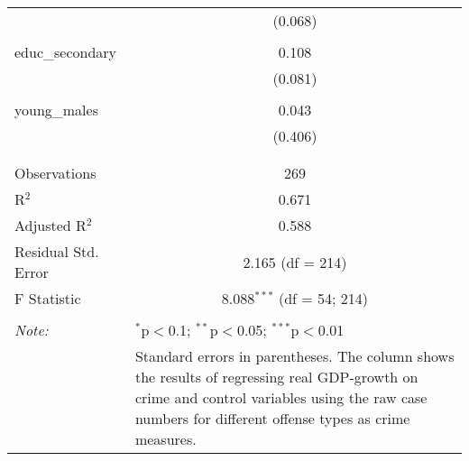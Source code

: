 \begin{table}[!htbp]
\begin{tabular}{@{\extracolsep{5pt}}lc}
  & (0.068) \\ 
  & \\ 
 educ\_secondary & 0.108 \\ 
  & (0.081) \\ 
  & \\ 
 young\_males & 0.043 \\ 
  & (0.406) \\ 
  & \\ 
\hline \\[-1.8ex] 
Observations & 269 \\ 
R$^{2}$ & 0.671 \\ 
Adjusted R$^{2}$ & 0.588 \\ 
Residual Std. Error & 2.165 (df = 214) \\ 
F Statistic & 8.088$^{***}$ (df = 54; 214) \\ 
\hline 
\hline \\[-1.8ex] 
\textit{Note:}  & \multicolumn{1}{l}{$^{*}$p$<$0.1; $^{**}$p$<$0.05; $^{***}$p$<$0.01} \\ 
 & \multicolumn{1}{l}{Standard errors in parentheses. The column shows the results of regressing real GDP-growth on crime and control variables using the raw case numbers for different offense types as crime measures.} \\ 
\end{tabular} 
\end{table} 
